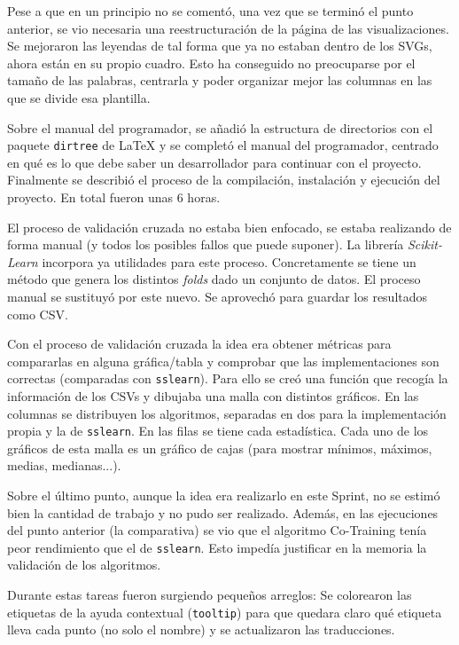 Pese a que en un principio no se comentó, una vez que se terminó el punto
anterior, se vio necesaria una reestructuración de la página de las
visualizaciones. Se mejoraron las leyendas de tal forma que ya no estaban dentro
de los SVGs, ahora están en su propio cuadro. Esto ha conseguido no preocuparse
por el tamaño de las palabras, centrarla y poder organizar mejor las columnas en
las que se divide esa plantilla.

Sobre el manual del programador, se añadió la estructura de directorios con el
paquete \texttt{dirtree} de \LaTeX{} y se completó el manual del programador,
centrado en qué es lo que debe saber un desarrollador para continuar con el
proyecto. Finalmente se describió el proceso de la compilación, instalación y
ejecución del proyecto. En total fueron unas 6 horas.

El proceso de validación cruzada no estaba bien enfocado, se estaba realizando
de forma manual (y todos los posibles fallos que puede suponer). La librería
\textit{Scikit-Learn} incorpora ya utilidades para este proceso. Concretamente
se tiene un método que genera los distintos \textit{folds} dado un conjunto de
datos. El proceso manual se sustituyó por este nuevo. Se aprovechó para guardar
los resultados como CSV.

Con el proceso de validación cruzada la idea era obtener métricas para
compararlas en alguna gráfica/tabla y comprobar que las implementaciones son
correctas (comparadas con \texttt{sslearn}). Para ello se creó una función que
recogía la información de los CSVs y dibujaba una malla con distintos gráficos.
En las columnas se distribuyen los algoritmos, separadas en dos para la
implementación propia y la de \texttt{sslearn}. En las filas se tiene cada
estadística. Cada uno de los gráficos de esta malla es un gráfico de cajas (para
mostrar mínimos, máximos, medias, medianas...).

Sobre el último punto, aunque la idea era realizarlo en este Sprint, no se
estimó bien la cantidad de trabajo y no pudo ser realizado. Además, en las
ejecuciones del punto anterior (la comparativa) se vio que el algoritmo
Co-Training tenía peor rendimiento que el de \texttt{sslearn}. Esto impedía
justificar en la memoria la validación de los algoritmos.

Durante estas tareas fueron surgiendo pequeños arreglos: Se colorearon las
etiquetas de la ayuda contextual (\texttt{tooltip}) para que quedara claro qué
etiqueta lleva cada punto (no solo el nombre) y se actualizaron las
traducciones.

